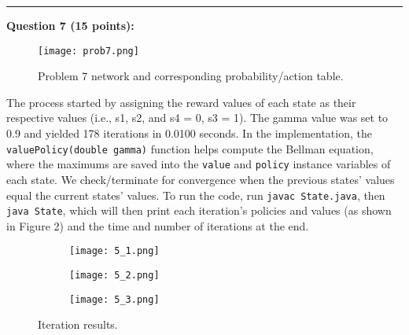 \documentclass[12pt]{article}
\begin{document}
\rule{\linewidth}{0.4pt}
\vspace{.2cm}

\textbf{Question 7 (15 points):} 
\begin{figure}[h]
    \centering
    \texttt{[image: prob7.png]}
    \caption{Problem 7 network and corresponding probability/action table.}
    \label{fig:prob7}
\end{figure}

The process started by assigning the reward values of each state as their respective values (i.e., s1, s2, and s4 = 0, s3 = 1). The gamma value was set to 0.9 and yielded 178 iterations in 0.0100 seconds. In the implementation, the \texttt{valuePolicy(double gamma)} function helps compute the Bellman equation, where the maximums are saved into the \texttt{value} and \texttt{policy} instance variables of each state. We check/terminate for convergence when the previous states' values equal the current states' values. To run the code, run \texttt{javac State.java}, then \texttt{java State}, which will then print each iteration's policies and values (as shown in Figure 2) and the time and number of iterations at the end.

    \begin{figure}
          \begin{subfigure}{0.31\textwidth}
            \centering
            \texttt{[image: 5\_1.png]}
            \caption{}
            \label{fig:5_1}
          \end{subfigure}
          \begin{subfigure}{0.31\textwidth}
            \centering
            \texttt{[image: 5\_2.png]}
            \caption{}
            \label{fig:5_2}
          \end{subfigure}
          \begin{subfigure}{0.31\textwidth}
            \centering
            \texttt{[image: 5\_3.png]}
            \caption{}
            \label{fig:5_3}
          \end{subfigure}
          \caption{Iteration results.}
    \end{figure}
\end{document}
